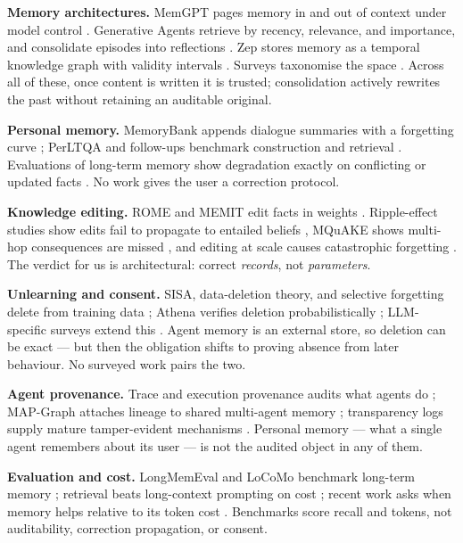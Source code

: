 \documentclass[11pt]{article}
\begin{document}
\textbf{Memory architectures.} MemGPT pages memory in and out of context under model control \cite{memgpt}. Generative Agents retrieve by recency, relevance, and importance, and consolidate episodes into reflections \cite{genagents}. Zep stores memory as a temporal knowledge graph with validity intervals \cite{zep}. Surveys taxonomise the space \cite{memorysurvey,memorymatters}. Across all of these, once content is written it is trusted; consolidation actively rewrites the past without retaining an auditable original.

\textbf{Personal memory.} MemoryBank appends dialogue summaries with a forgetting curve \cite{memorybank}; PerLTQA and follow-ups benchmark construction and retrieval \cite{perltqa,memconstruct,simplebaseline}. Evaluations of long-term memory show degradation exactly on conflicting or updated facts \cite{longtermeval}. No work gives the user a correction protocol.

\textbf{Knowledge editing.} ROME and MEMIT edit facts in weights \cite{rome,memit,decao,kesurvey}. Ripple-effect studies show edits fail to propagate to entailed beliefs \cite{ripple}, MQuAKE shows multi-hop consequences are missed \cite{mquake}, and editing at scale causes catastrophic forgetting \cite{editatscale}. The verdict for us is architectural: correct \emph{records}, not \emph{parameters}.

\textbf{Unlearning and consent.} SISA, data-deletion theory, and selective forgetting delete from training data \cite{ginart,sisa,eternal}; Athena verifies deletion probabilistically \cite{athena}; LLM-specific surveys extend this \cite{frontier,whatforget}. Agent memory is an external store, so deletion can be exact --- but then the obligation shifts to proving absence from later behaviour. No surveyed work pairs the two.

\textbf{Agent provenance.} Trace and execution provenance audits what agents do \cite{agenttrace}; MAP-Graph attaches lineage to shared multi-agent memory \cite{mapgraph}; transparency logs supply mature tamper-evident mechanisms \cite{transplogs}. Personal memory --- what a single agent remembers about its user --- is not the audited object in any of them.

\textbf{Evaluation and cost.} LongMemEval and LoCoMo benchmark long-term memory \cite{longmemeval,locomo}; retrieval beats long-context prompting on cost \cite{ragvslc,lostmiddle,compressctx}; recent work asks when memory helps relative to its token cost \cite{costaware,recallforget,agentmembench}. Benchmarks score recall and tokens, not auditability, correction propagation, or consent.
\end{document}
